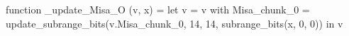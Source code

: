 function _update_Misa_O (v, x) = let v = { v with Misa_chunk_0 = update_subrange_bits(v.Misa_chunk_0, 14, 14, subrange_bits(x, 0, 0)) } in
  v
